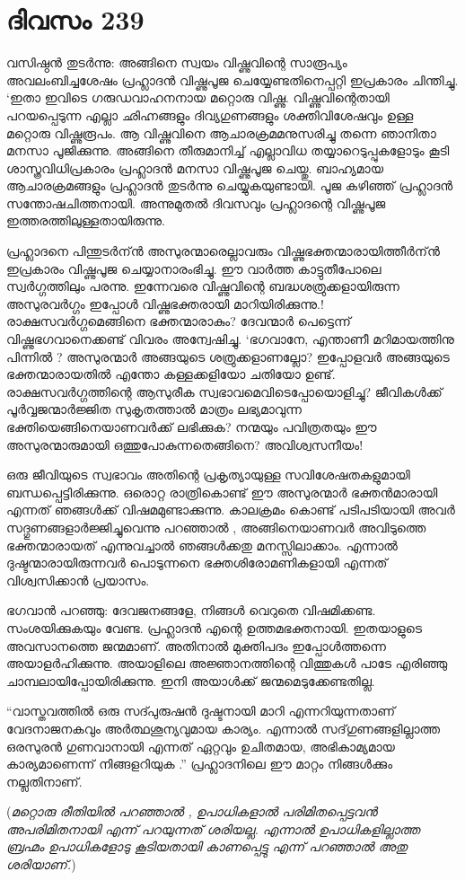 \section{ദിവസം 239}


വസിഷ്ഠന്‍ തുടര്‍ന്നു: അങ്ങിനെ സ്വയം വിഷ്ണുവിന്റെ സാരൂപ്യം അവലംബിച്ചശേഷം പ്രഹ്ലാദന്‍ വിഷ്ണുപൂജ ചെയ്യേണ്ടതിനെപ്പറ്റി ഇപ്രകാരം ചിന്തിച്ചു. ‘ഇതാ ഇവിടെ ഗരുഡവാഹനനായ  മറ്റൊരു വിഷ്ണു. വിഷ്ണുവിന്റെതായി പറയപ്പെടുന്ന എല്ലാ ഛിഹ്നങ്ങളും ദിവ്യഗുണങ്ങളും ശക്തിവിശേഷവും ഉള്ള മറ്റൊരു വിഷ്ണുരൂപം. ആ വിഷ്ണുവിനെ ആചാരക്രമമനുസരിച്ചു തന്നെ  ഞാനിതാ മനസാ പൂജിക്കുന്നു. അങ്ങിനെ തീരുമാനിച്ച് എല്ലാവിധ തയ്യാറെടുപ്പുകളോടും കൂടി ശാസ്ത്രവിധിപ്രകാരം  പ്രഹ്ലാദന്‍ മനസാ വിഷ്ണുപൂജ ചെയ്തു. ബാഹ്യമായ ആചാരക്രമങ്ങളും പ്രഹ്ലാദന്‍ തുടര്‍ന്നു ചെയ്യുകയുണ്ടായി. പൂജ കഴിഞ്ഞ് പ്രഹ്ലാദന്‍ സന്തോഷചിത്തനായി. അന്നുമുതല്‍ ദിവസവും പ്രഹ്ലാദന്റെ വിഷ്ണുപൂജ ഇത്തരത്തിലുള്ളതായിരുന്നു.
  
പ്രഹ്ലാദനെ പിന്തുടര്‍ന്ന്‍ അസുരന്മാരെല്ലാവരും വിഷ്ണുഭക്തന്മാരായിത്തീര്‍ന്ന്‍   ഇപ്രകാരം വിഷ്ണുപൂജ ചെയ്യാനാരംഭിച്ചു. ഈ വാര്‍ത്ത കാട്ടുതീപോലെ സ്വര്‍ഗ്ഗത്തിലും പരന്നു. ഇന്നേവരെ വിഷ്ണുവിന്റെ ബദ്ധശത്രുക്കളായിരുന്ന അസുരവര്‍ഗ്ഗം ഇപ്പോള്‍ വിഷ്ണുഭക്തരായി മാറിയിരിക്കുന്നു.! രാക്ഷസവര്‍ഗ്ഗമെങ്ങിനെ ഭക്തന്മാരാകും? ദേവന്മാര്‍ പെട്ടെന്ന് വിഷ്ണുഭഗവാനെക്കണ്ട് വിവരം അന്വേഷിച്ചു. ‘ഭഗവാനേ, എന്താണീ മറിമായത്തിനു പിന്നില്‍ ? അസുരന്മാര്‍ അങ്ങയുടെ ശത്രുക്കളാണല്ലോ? ഇപ്പോളവര്‍ അങ്ങയുടെ ഭക്തന്മാരായതില്‍ എന്തോ കള്ളക്കളിയോ ചതിയോ ഉണ്ട്. രാക്ഷസവര്‍ഗ്ഗത്തിന്റെ ആസുരീക സ്വഭാവമെവിടെപ്പോയൊളിച്ചു? ജീവികള്‍ക്ക് പൂര്‍വ്വജന്മാര്‍ജ്ജിത സുകൃതത്താല്‍ മാത്രം ലഭ്യമാവുന്ന ഭക്തിയെങ്ങിനെയാണവര്‍ക്ക് ലഭിക്കുക? നന്മയും പവിത്രതയും ഈ അസുരന്മാരുമായി ഒത്തുപോകുന്നതെങ്ങിനെ? അവിശ്വസനീയം!

ഒരു ജീവിയുടെ സ്വഭാവം അതിന്റെ പ്രകൃത്യായുള്ള സവിശേഷതകളുമായി ബന്ധപ്പെട്ടിരിക്കുന്നു. ഒരൊറ്റ രാത്രികൊണ്ട് ഈ അസുരന്മാര്‍ ഭക്തന്‍മാരായി എന്നത് ഞങ്ങള്‍ക്ക് വിഷമമുണ്ടാക്കുന്നു. കാലക്രമം കൊണ്ട് പടിപടിയായി അവര്‍ സദ്ഗുണങ്ങളാര്‍ജ്ജിച്ചുവെന്നു പറഞ്ഞാല്‍ , അങ്ങിനെയാണവര്‍ അവിടുത്തെ ഭക്തന്മാരായത് എന്നുവച്ചാല്‍ ഞങ്ങള്‍ക്കതു മനസ്സിലാക്കാം. എന്നാല്‍ ദുഷ്ടന്മാരായിരുന്നവര്‍ പൊടുന്നനെ ഭക്തശിരോമണികളായി എന്നത് വിശ്വസിക്കാന്‍ പ്രയാസം.

ഭഗവാന്‍ പറഞ്ഞു: ദേവജനങ്ങളേ, നിങ്ങള്‍ വെറുതെ വിഷമിക്കണ്ട. സംശയിക്കുകയും വേണ്ട. പ്രഹ്ലാദന്‍ എന്റെ ഉത്തമഭക്തനായി. ഇതയാളുടെ അവസാനത്തെ ജന്മമാണ്. അതിനാല്‍ മുക്തിപദം ഇപ്പോള്‍ത്തന്നെ അയാളര്‍ഹിക്കുന്നു. അയാളിലെ അജ്ഞാനത്തിന്റെ വിത്തുകള്‍ പാടേ എരിഞ്ഞു  ചാമ്പലായിപ്പോയിരിക്കുന്നു. ഇനി അയാള്‍ക്ക് ജന്മമെടുക്കേണ്ടതില്ല.

“വാസ്തവത്തില്‍ ഒരു സദ്പുരുഷന്‍ ദുഷ്ടനായി മാറി എന്നറിയുന്നതാണ് വേദനാജനകവും അര്‍ത്ഥശൂന്യവുമായ കാര്യം. എന്നാല്‍ സദ്‌ഗുണങ്ങളില്ലാത്ത ഒരസുരന്‍ ഗുണവാനായി എന്നത് ഏറ്റവും ഉചിതമായ, അഭികാമ്യമായ കാര്യമാണെന്ന് നിങ്ങളറിയുക .” പ്രഹ്ലാദനിലെ ഈ മാറ്റം നിങ്ങള്‍ക്കും നല്ലതിനാണ്.

(\textit{മറ്റൊരു രീതിയില്‍ പറഞ്ഞാല്‍ , ഉപാധികളാല്‍ പരിമിതപ്പെട്ടവന്‍ അപരിമിതനായി എന്ന് പറയുന്നത് ശരിയല്ല. എന്നാല്‍ ഉപാധികളില്ലാത്ത ബ്രഹ്മം ഉപാധികളോടു കൂടിയതായി കാണപ്പെട്ടു എന്ന് പറഞ്ഞാല്‍ അതു ശരിയാണ്.}) 

